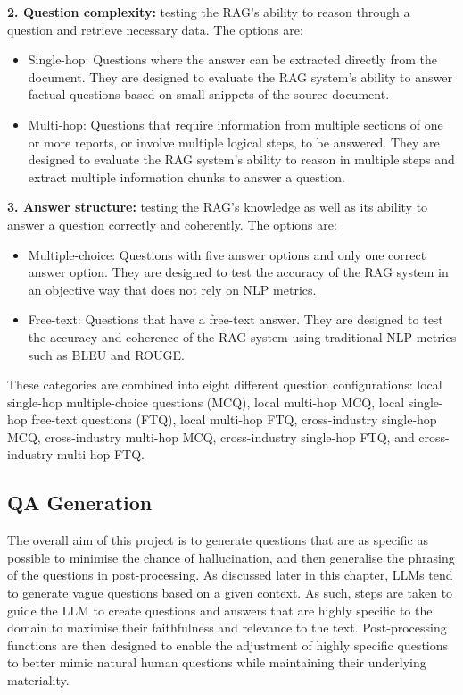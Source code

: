 \textbf{2. Question complexity:} testing the RAG's ability to reason through a question and retrieve necessary data. The options are:
\begin{itemize}
    \item Single-hop: Questions where the answer can be extracted directly from the document. They are designed to evaluate the RAG system's ability to answer factual questions based on small snippets of the source document.
    \item Multi-hop: Questions that require information from multiple sections of one or more reports, or involve multiple logical steps, to be answered. They are designed to evaluate the RAG system's ability to reason in multiple steps and extract multiple information chunks to answer a question.
\end{itemize}

\textbf{3. Answer structure:} testing the RAG's knowledge as well as its ability to answer a question correctly and coherently. The options are:
\begin{itemize}
    \item Multiple-choice: Questions with five answer options and only one correct answer option. They are designed to test the accuracy of the RAG system in an objective way that does not rely on NLP metrics.
    \item Free-text: Questions that have a free-text answer. They are designed to test the accuracy and coherence of the RAG system using traditional NLP metrics such as BLEU and ROUGE.
\end{itemize}

These categories are combined into eight different question configurations: local single-hop multiple-choice questions (MCQ), local multi-hop MCQ, local single-hop free-text questions (FTQ), local multi-hop FTQ, cross-industry single-hop MCQ, cross-industry multi-hop MCQ, cross-industry single-hop FTQ, and cross-industry multi-hop FTQ. 


\subsection{QA Generation}\label{QA_gen}

The overall aim of this project is to generate questions that are as specific as possible to minimise the chance of hallucination, and then generalise the phrasing of the questions in post-processing. As discussed later in this chapter, LLMs tend to generate vague questions based on a given context. As such, steps are taken to guide the LLM to create questions and answers that are highly specific to the domain to maximise their faithfulness and relevance to the text. Post-processing functions are then designed to enable the adjustment of highly specific questions to better mimic natural human questions while maintaining their underlying materiality.\\

